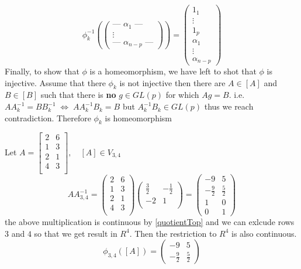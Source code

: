 \documentclass[11pt,a4paper]{report}
\begin{document}
$$\phi_{k}^{-1}(\begin{pmatrix} \text{--- } \alpha_{1} \text{ ---}  \\ \vdots \\ \text{--- }  \alpha_{n-p} \text{ ---} \end{pmatrix}) =
\begin{pmatrix} 1_1 \\ \vdots  \\ 1_p \\ \alpha_1 \\ \vdots \\  \alpha_{n-p}  \end{pmatrix} $$
Finally, to show that $\phi$ is a homeomorphism,
we have left to shot that $\phi$ is injective. 
\newline
Assume that there $\phi_{k}$ is not injective then there are $A \in [A]$ and $B \in [B]$ such that there is \textbf{no} $g \in GL(p)$
for which $A g =  B$. i.e. $A A_{k}^{-1} = B B_{k}^{-1} \; \iff  \; 
 A A_{k}^{-1} B_{k} = B$ but $A_{k}^{-1} B_{k} \in GL(p)$ thus we reach contradiction.
Therefore $\phi_{k}$ is homeomorphism
\newline 
\begin{Ex} \label{ex1}
    Let $A = \begin{bmatrix}
        2 & 6 \\
        1 & 3 \\
        2 & 1 \\
        4 & 3 \\
    \end{bmatrix}, \quad [ A ] \in V_{3,4}$
    $$ A A_{3,4}^{-1} =  \begin{pmatrix} 2 & 6 \\ 1 & 3 \\ 2 & 1 \\ 4 & 3 \\ \end{pmatrix} \begin{pmatrix} \frac{3}{2} & -\frac{1}{2} \\ -2 & 1 \\ \end{pmatrix}
    = \begin{pmatrix} -9 & 5 \\ -\frac{9}{2} & \frac{5}{2} \\ 1 & 0 \\ 0 & 1 \end{pmatrix}
    $$
    the above multiplication is continuous by \ref{quotientTop} and we can exlcude rows $3$ and $4$ so that we get result in $R^4$.
    Then the restriction to $R^4$ is also continuous.
    $$ \phi_{3,4}([A]) = \begin{pmatrix} -9 & 5 \\ -\frac{9}{2} & \frac{5}{2} \end{pmatrix} $$
\end{Ex}
\end{document}
